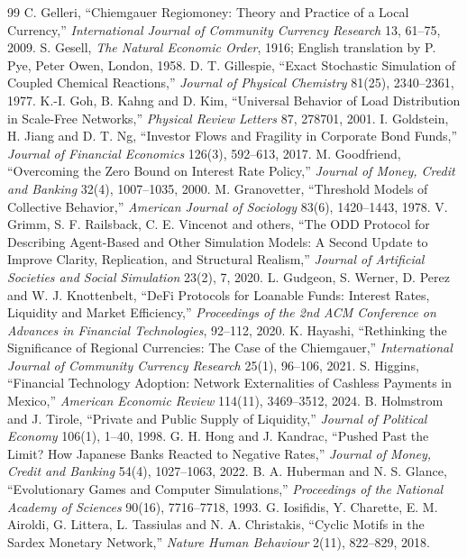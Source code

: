 \documentclass[10pt,a4paper]{article}
\theoremstyle{remark}
\begin{document}
\begin{thebibliography}{99}
 C. Gelleri, ``Chiemgauer Regiomoney: Theory and Practice of a Local Currency,'' \emph{International Journal of Community Currency Research} 13, 61--75, 2009.
 S. Gesell, \emph{The Natural Economic Order}, 1916; English translation by P. Pye, Peter Owen, London, 1958.
 D. T. Gillespie, ``Exact Stochastic Simulation of Coupled Chemical Reactions,'' \emph{Journal of Physical Chemistry} 81(25), 2340--2361, 1977.
 K.-I. Goh, B. Kahng and D. Kim, ``Universal Behavior of Load Distribution in Scale-Free Networks,'' \emph{Physical Review Letters} 87, 278701, 2001.
 I. Goldstein, H. Jiang and D. T. Ng, ``Investor Flows and Fragility in Corporate Bond Funds,'' \emph{Journal of Financial Economics} 126(3), 592--613, 2017.
 M. Goodfriend, ``Overcoming the Zero Bound on Interest Rate Policy,'' \emph{Journal of Money, Credit and Banking} 32(4), 1007--1035, 2000.
 M. Granovetter, ``Threshold Models of Collective Behavior,'' \emph{American Journal of Sociology} 83(6), 1420--1443, 1978.
 V. Grimm, S. F. Railsback, C. E. Vincenot and others, ``The ODD Protocol for Describing Agent-Based and Other Simulation Models: A Second Update to Improve Clarity, Replication, and Structural Realism,'' \emph{Journal of Artificial Societies and Social Simulation} 23(2), 7, 2020.
 L. Gudgeon, S. Werner, D. Perez and W. J. Knottenbelt, ``DeFi Protocols for Loanable Funds: Interest Rates, Liquidity and Market Efficiency,'' \emph{Proceedings of the 2nd ACM Conference on Advances in Financial Technologies}, 92--112, 2020.
 K. Hayashi, ``Rethinking the Significance of Regional Currencies: The Case of the Chiemgauer,'' \emph{International Journal of Community Currency Research} 25(1), 96--106, 2021.
 S. Higgins, ``Financial Technology Adoption: Network Externalities of Cashless Payments in Mexico,'' \emph{American Economic Review} 114(11), 3469--3512, 2024.
 B. Holmstrom and J. Tirole, ``Private and Public Supply of Liquidity,'' \emph{Journal of Political Economy} 106(1), 1--40, 1998.
 G. H. Hong and J. Kandrac, ``Pushed Past the Limit? How Japanese Banks Reacted to Negative Rates,'' \emph{Journal of Money, Credit and Banking} 54(4), 1027--1063, 2022.
 B. A. Huberman and N. S. Glance, ``Evolutionary Games and Computer Simulations,'' \emph{Proceedings of the National Academy of Sciences} 90(16), 7716--7718, 1993.
 G. Iosifidis, Y. Charette, E. M. Airoldi, G. Littera, L. Tassiulas and N. A. Christakis, ``Cyclic Motifs in the Sardex Monetary Network,'' \emph{Nature Human Behaviour} 2(11), 822--829, 2018.

\end{thebibliography}
\end{document}
